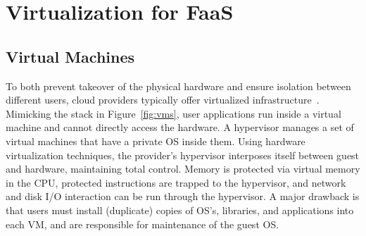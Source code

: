 
\section{Virtualization for FaaS}
\label{sec:virtualization}


\subsection{Virtual Machines}


To both prevent takeover of the physical hardware and ensure isolation between different users, cloud providers typically offer virtualized infrastructure~\cite{xen}.
Mimicking the stack in Figure~\ref{fig:vms}, user applications run inside a virtual machine and cannot directly access the hardware.
A hypervisor manages a set of virtual machines that have a private OS inside them.
Using hardware virtualization techniques, the provider's hypervisor interposes itself between guest and hardware, maintaining total control.
Memory is protected via virtual memory in the CPU, protected instructions are trapped to the hypervisor, and network and disk I/O interaction can be run through the hypervisor.
A major drawback is that users must install (duplicate) copies of OS's, libraries, and applications into each VM, and are responsible for maintenance of the guest OS.


